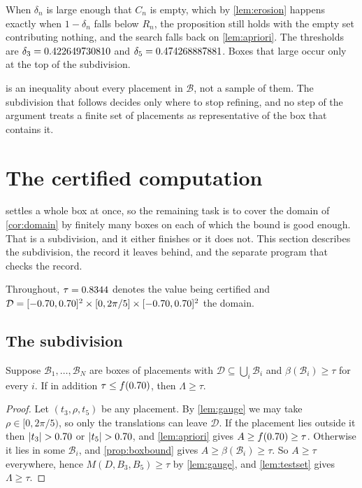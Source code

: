 \documentclass[a4paper,UKenglish,cleveref,autoref,thm-restate,numberwithinsect]{lipics-v2021}
\begin{document}
\begin{remark}
\label{rem:degenerate}
When $\delta_n$ is large enough that $C_n$ is empty, which by \cref{lem:erosion}
happens exactly when $1-\delta_n$ falls below $R_n$, the proposition still holds
with the empty set contributing nothing, and the search falls back on
\cref{lem:apriori}. The thresholds are $\delta_3=0.422649730810$ and
$\delta_5=0.474268887881$. Boxes that large occur only at the top of the subdivision.
\end{remark}

\begin{remark}
\label{rem:notgrid}
 is an inequality about every placement in $\mathcal{B}$, not
a sample of them. The subdivision that follows decides only where to stop
refining, and no step of the argument treats a finite set of placements as
representative of the box that contains it.
\end{remark}

\section{The certified computation}
\label{sec:computation}

 settles a whole box at once, so the remaining task is to
cover the domain of \cref{cor:domain} by finitely many boxes on each of which the
bound is good enough. That is a subdivision, and it either finishes or it does
not. This section describes the subdivision, the record it leaves behind, and the
separate program that checks the record.

Throughout, $\tau=0.8344$ denotes the value being certified and
$\mathcal{D}=[-0.70,0.70]^{2}\times[0,2\pi/5]\times
[-0.70,0.70]^{2}$ the domain.

\subsection{The subdivision}

\begin{proposition}
\label{prop:cover}
Suppose $\mathcal{B}_1,\dots,\mathcal{B}_N$ are boxes of placements with
$\mathcal{D}\subseteq\bigcup_i\mathcal{B}_i$ and
$\beta(\mathcal{B}_i)\ge\tau$ for every $i$. If in addition
$\tau\le f(0.70)$, then $\Lambda\ge\tau$.
\end{proposition}

\begin{proof}
Let $(t_3,\rho,t_5)$ be any placement. By \cref{lem:gauge} we may take
$\rho\in[0,2\pi/5)$, so only the translations can leave $\mathcal{D}$. If the
placement lies outside it then $|t_3|>\TmaxNaive$ or $|t_5|>\TmaxNaive$, and
\cref{lem:apriori} gives $A\ge f(0.70)\ge\tau$. Otherwise it lies in some $\mathcal{B}_i$, and
\cref{prop:boxbound} gives $A\ge\beta(\mathcal{B}_i)\ge\tau$. So $A\ge\tau$
everywhere, hence $M(D,B_3,B_5)\ge\tau$ by \cref{lem:gauge}, and
\cref{lem:testset} gives $\Lambda\ge\tau$.
\end{proof}
\end{document}
